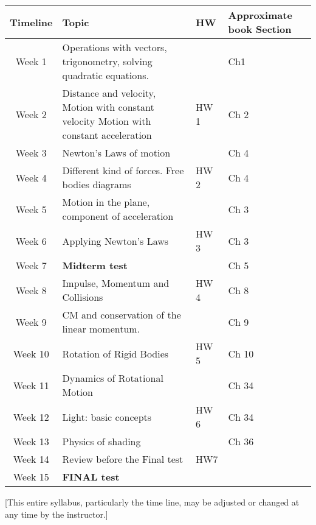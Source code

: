 \documentclass[12pt]{article}
\begin{document}
\begin{center}

 \begin{tabular}{|c |l| l| l|} 


 \hline
Timeline & Topic & HW &\multicolumn{1}{p{3cm}|}{ Approximate book Section} \\ [0.5ex] 
 \hline\hline
 Week 1 &\multicolumn{1}{p{10cm}|}{ Operations with vectors, trigonometry, solving quadratic
equations.} &  &Ch1  \\ 
 \hline
  Week 2 & \multicolumn{1}{p{10cm}|}{Distance and velocity, Motion with constant velocity
Motion with constant acceleration}   &HW 1 &Ch 2  \\
 \hline
 Week 3 &Newton's Laws of motion & & Ch 4 \\
 \hline
 Week 4 & \multicolumn{1}{p{10cm}|}{Different kind of forces. Free bodies diagrams}  & HW 2 & Ch 4 \\
 \hline

 Week 5 & \multicolumn{1}{p{10cm}|}{ Motion in the plane, component of acceleration } & & Ch 3  \\
\hline

 Week 6 & \multicolumn{1}{p{10cm}|}{ Applying Newton's Laws } &  HW 3& Ch 3  \\
\hline

 Week 7 &\multicolumn{1}{p{10cm}|}{ \textbf{Midterm test} } 
 &  & Ch 5 \\ 

 \hline
 Week 8 &\multicolumn{1}{p{10cm}|}{ Impulse, Momentum and Collisions }&  HW 4 &Ch 8  \\ 
 \hline
 Week 9 & \multicolumn{1}{p{10cm}|}{CM and conservation of the linear momentum. }
 & & Ch 9 \\ 
 \hline
 Week 10 &\multicolumn{1}{p{10cm}|}{ Rotation of Rigid Bodies} & HW 5 &Ch 10  \\ 
 \hline
 Week 11 &\multicolumn{1}{p{10cm}|}{Dynamics of Rotational Motion }&  & Ch 34 \\ 
 \hline
 Week 12 &\multicolumn{1}{p{10cm}|}{Light: basic concepts}  & HW 6 & Ch 34 \\ 
 \hline
 Week 13 & \multicolumn{1}{p{10cm}|}{ Physics of shading} &  & Ch 36 \\ 
 \hline
 Week 14 &\multicolumn{1}{p{10cm}|}{Review before the Final test } &HW7   &  \\ 
 \hline

 Week 15 & \textbf{FINAL test}&  &  \\ 
 \hline
\end{tabular}

\end{center}


[This entire syllabus, particularly the time line, may be adjusted or changed at any time by the instructor.]
\end{document}
